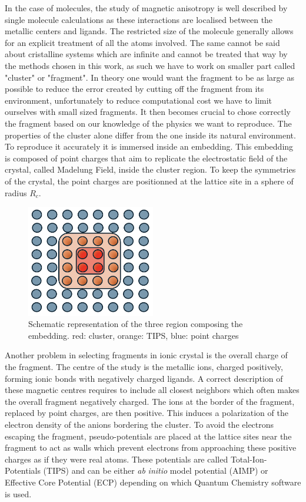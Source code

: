 \documentclass[12pt]{report}
\numberwithin{equation}{section}
\begin{document}
In the case of molecules, the study of magnetic anisotropy is well described by single molecule calculations as these interactions are localised between the metallic centers and ligands. 
The restricted size of the molecule generally allows for an explicit treatment of all the atoms involved.
The same cannot be said about cristalline systems which are infinite and cannot be treated that way by the methods chosen in this work, as such we have to work on smaller part called "cluster" or "fragment".
In theory one would want the fragment to be as large as possible to reduce the error created by cutting off the fragment from its environment, unfortunately to reduce computational cost we have to limit ourselves with small sized fragments. 
It then becomes crucial to chose correctly the fragment based on our knowledge of the physics we want to reproduce.
The properties of the cluster alone differ from the one inside its natural environment. To reproduce it accurately it is immersed inside an embedding. 
This embedding is composed of point charges that aim to replicate the electrostatic field of the crystal, called Madelung Field, inside the cluster region. 
To keep the symmetries of the crystal, the point charges are positionned at the lattice site in a sphere of radius $R_c$. 
\begin{figure}[!ht]
    \centering
    \includegraphics[width=0.5\textwidth]{Images/Bain.png}
    \caption{Schematic representation of the three region composing the embedding. red: cluster, orange: TIPS, blue: point charges}
    \label{Bain}
\end{figure}
Another problem in selecting fragments in ionic crystal is the overall charge of the fragment.
The centre of the study is the metallic ions, charged positively, forming ionic bonds with negatively charged ligands.
A correct description of these magnetic centres requires to include all closest neighbors which often makes the overall fragment negatively charged.
The ions at the border of the fragment, replaced by point charges, are then positive. This induces a polarization of the electron density of the anions bordering the cluster.
To avoid the electrons escaping the fragment, pseudo-potentials are placed at the lattice sites near the fragment to act as walls which prevent electrons from approaching these positive charges as if they were real atoms.
These potentials are called Total-Ion-Potentials (TIPS) and can be either \textit{ab} \textit{initio} model potential (AIMP) or Effective Core Potential (ECP) depending on which Quantum Chemistry software is used.
\end{document}
